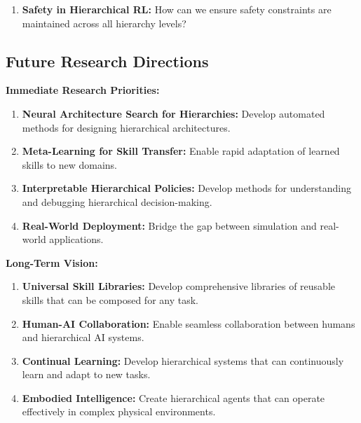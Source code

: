 \documentclass[12pt]{article}
\begin{document}
{{\begin{enumerate}
    \item \textbf{Safety in Hierarchical RL:} How can we ensure safety constraints are maintained across all hierarchy levels?
\end{enumerate}

\subsection{Future Research Directions}

\textbf{Immediate Research Priorities:}
\begin{enumerate}
    \item \textbf{Neural Architecture Search for Hierarchies:} Develop automated methods for designing hierarchical architectures.
    
    \item \textbf{Meta-Learning for Skill Transfer:} Enable rapid adaptation of learned skills to new domains.
    
    \item \textbf{Interpretable Hierarchical Policies:} Develop methods for understanding and debugging hierarchical decision-making.
    
    \item \textbf{Real-World Deployment:} Bridge the gap between simulation and real-world applications.
\end{enumerate}

\textbf{Long-Term Vision:}
\begin{enumerate}
    \item \textbf{Universal Skill Libraries:} Develop comprehensive libraries of reusable skills that can be composed for any task.
    
    \item \textbf{Human-AI Collaboration:} Enable seamless collaboration between humans and hierarchical AI systems.
    
    \item \textbf{Continual Learning:} Develop hierarchical systems that can continuously learn and adapt to new tasks.
    
    \item \textbf{Embodied Intelligence:} Create hierarchical agents that can operate effectively in complex physical environments.
\end{enumerate}


}}


\newpage
\end{document}
